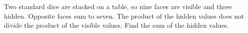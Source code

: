 Two standard dice are stacked on a table, so nine faces are visible and three hidden. Opposite faces sum to seven. The product of the hidden values does not divide the product of the visible values. Find the sum of the hidden values.
